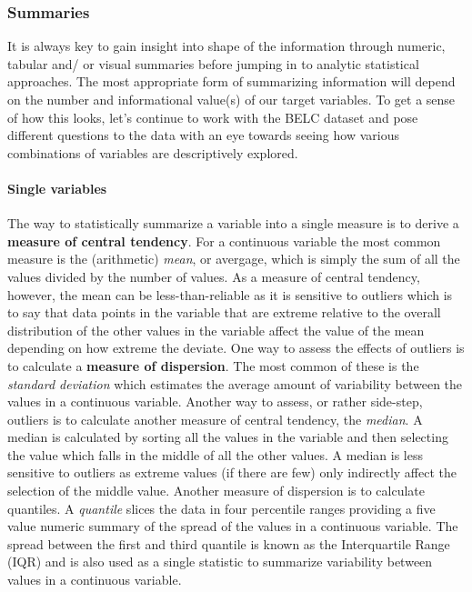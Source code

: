 \documentclass[
]{article}
\begin{document}
\hypertarget{summaries}{%
\subsubsection{Summaries}\label{summaries}}

It is always key to gain insight into shape of the information through numeric, tabular and/ or visual summaries before jumping in to analytic statistical approaches. The most appropriate form of summarizing information will depend on the number and informational value(s) of our target variables. To get a sense of how this looks, let's continue to work with the BELC dataset and pose different questions to the data with an eye towards seeing how various combinations of variables are descriptively explored.

\hypertarget{single-variables}{%
\paragraph{Single variables}\label{single-variables}}

The way to statistically summarize a variable into a single measure is to derive a \textbf{measure of central tendency}. For a continuous variable the most common measure is the (arithmetic) \emph{mean}, or avergage, which is simply the sum of all the values divided by the number of values. As a measure of central tendency, however, the mean can be less-than-reliable as it is sensitive to outliers which is to say that data points in the variable that are extreme relative to the overall distribution of the other values in the variable affect the value of the mean depending on how extreme the deviate. One way to assess the effects of outliers is to calculate a \textbf{measure of dispersion}. The most common of these is the \emph{standard deviation} which estimates the average amount of variability between the values in a continuous variable. Another way to assess, or rather side-step, outliers is to calculate another measure of central tendency, the \emph{median}. A median is calculated by sorting all the values in the variable and then selecting the value which falls in the middle of all the other values. A median is less sensitive to outliers as extreme values (if there are few) only indirectly affect the selection of the middle value. Another measure of dispersion is to calculate quantiles. A \emph{quantile} slices the data in four percentile ranges providing a five value numeric summary of the spread of the values in a continuous variable. The spread between the first and third quantile is known as the Interquartile Range (IQR) and is also used as a single statistic to summarize variability between values in a continuous variable.
\end{document}
